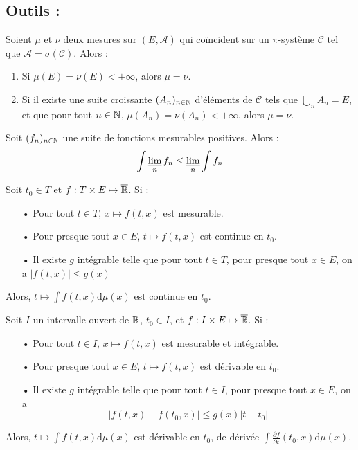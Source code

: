 \documentclass[11pt,a4paper]{article}
\begin{document}
\subsection*{Outils :}


\begin{cor} Soient $\mu$ et $\nu$ deux mesures sur $(E,\mathcal{A})$ qui coïncident sur un $\pi$-système $\mathcal{C}$ tel que $\mathcal{A}=\sigma(\mathcal{C})$. Alors :
\begin{enumerate}
\item Si $\mu(E)=\nu(E) < +\infty$, alors $\mu = \nu$.
\item Si il existe une suite croissante $(A_n)_{n\in\mathbb N}$ d'éléments de $\mathcal{C}$ tels que $\displaystyle \bigcup_n A_n = E$, et que pour tout $n\in\mathbb N$, $\mu(A_n)=\nu(A_n)<+\infty$, alors $\mu = \nu$.
\end{enumerate}
\end{cor}


\begin{lemma}[Fatou]
Soit $(f_n)_{n\in\mathbb N}$ une suite de fonctions mesurables positives. Alors :
\[\int \varliminf_n f_n \leq \varliminf_n \int f_n\]
\end{lemma}


\begin{prop}
Soit $t_0 \in T$  et $f : T \times E \mapsto \overline{\mathbb R} $. Si :
\begin{itemize}
\item[•] Pour tout $t\in T$, $x\mapsto f(t,x)$ est mesurable.
\item[•] Pour presque tout $x \in E$, $t\mapsto f(t,x)$ est continue en $t_0$.
\item[•] Il existe $g$ intégrable telle que pour tout $t\in T$, pour presque tout $x \in E$, on a $\left| f(t,x) \right| \leq g(x)$
\end{itemize}
Alors, $t\mapsto \displaystyle \int f(t,x)\mathrm{d}\mu(x)$ est continue en $t_0$.
\end{prop}


\begin{prop}
Soit $I$ un intervalle ouvert de $\mathbb R$, $t_0 \in I$, et $f:I \times E \mapsto \overline{\mathbb R}$. Si :
\begin{itemize}
\item[•] Pour tout $t\in I$, $x\mapsto f(t,x)$ est mesurable et intégrable.
\item[•] Pour presque tout $x \in E$, $t\mapsto f(t,x)$ est dérivable en $t_0$.
\item[•] Il existe $g$ intégrable telle que pour tout $t\in I$, pour presque tout $x \in E$, on a \[\left| f(t,x) - f(t_0,x) \right| \leq g(x) \left|t-t_0\right|\]
\end{itemize}
Alors, $t\mapsto \displaystyle \int f(t,x)\mathrm{d}\mu(x)$ est dérivable en $t_0$, de dérivée $\displaystyle \int \frac{\partial f}{\partial t} (t_0,x)\mathrm{d}\mu(x)$.
\end{prop}
\end{document}

